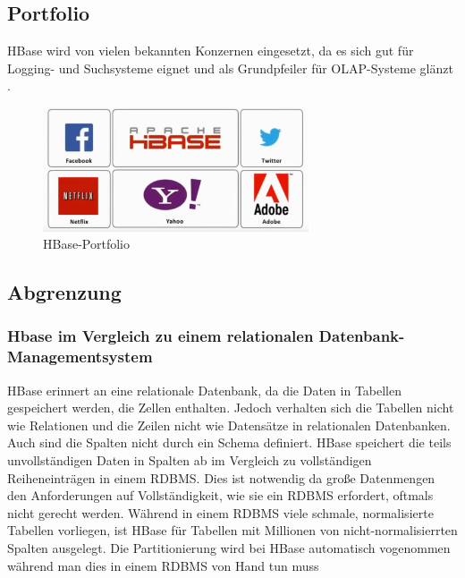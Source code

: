 

\subsection{Portfolio}
HBase wird von vielen bekannten Konzernen eingesetzt, da es sich gut für Logging- und Suchsysteme  eignet und als Grundpfeiler für \ac{OLAP}-Systeme glänzt \cite{Redt01}.

\begin{figure}[htbp] 
  \centering
     \includegraphics[width=0.7\textwidth]{images/portfolio.png}
  \caption{HBase-Portfolio}
  \label{fig:Portfolio}
\end{figure}

\subsection{Abgrenzung}



\subsubsection{Hbase im Vergleich zu einem relationalen Datenbank-Managementsystem}
HBase erinnert an eine relationale Datenbank, da die Daten in Tabellen gespeichert werden, die Zellen enthalten. Jedoch verhalten sich die Tabellen nicht wie Relationen und die Zeilen nicht wie Datensätze in relationalen Datenbanken. Auch sind die Spalten nicht durch ein Schema definiert.
HBase speichert die teils unvollständigen Daten in Spalten ab im Vergleich zu vollständigen Reiheneinträgen in einem RDBMS. Dies ist notwendig da große Datenmengen den Anforderungen auf Vollständigkeit, wie sie ein RDBMS erfordert, oftmals nicht gerecht werden.  
Während in einem RDBMS viele schmale, normalisierte Tabellen vorliegen, ist HBase für Tabellen mit Millionen von nicht-normalisierrten Spalten ausgelegt. Die Partitionierung wird bei HBase automatisch vogenommen während man dies in einem RDBMS von Hand tun muss



